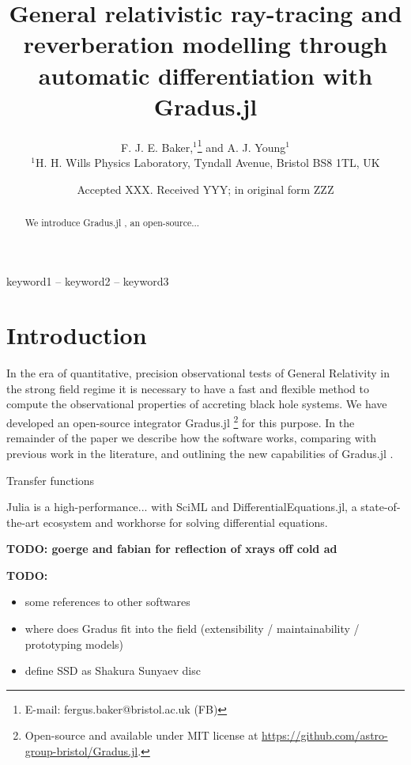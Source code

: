 \documentclass[fleqn,usenatbib]{mnras}
\title[Gradus.jl]{General relativistic ray-tracing and reverberation modelling through automatic differentiation with Gradus.jl}
\author[F. J. E. Baker et al.]{
F. J. E. Baker,$^{1}$\thanks{E-mail: fergus.baker@bristol.ac.uk (FB)}
and A. J. Young$^{1}$
\\
$^{1}$H. H. Wills Physics Laboratory, Tyndall Avenue, Bristol BS8 1TL, UK
}
\date{Accepted XXX. Received YYY; in original form ZZZ}
\newcommand{\todo}[1]{{\noindent \bf \color{red} TODO: #1}}
\newcommand{\notes}[1]{{\color{cyan} #1}}
\newcommand{\Gradus}{Gradus.jl }
\begin{document}
\label{firstpage}
\pagerange{\pageref{firstpage}--\pageref{lastpage}}
\maketitle
\begin{abstract}
	We introduce \Gradus, an open-source...
\end{abstract}

\begin{keywords}
keyword1 -- keyword2 -- keyword3
\end{keywords}



\section{Introduction}

\notes{
In the era of quantitative, precision observational tests of General Relativity in the strong field regime it is necessary to have a fast and flexible method to compute the observational properties of accreting black hole systems. We have developed an open-source integrator
\Gradus\footnote{Open-source and available under MIT license at \url{https://github.com/astro-group-bristol/Gradus.jl}.} for this purpose. In the remainder of the paper we describe how the software works, comparing with previous work in the literature, and outlining the new capabilities of \Gradus.

Transfer functions \citep{cunningham_effects_1975} %

Julia is a high-performance... with SciML and DifferentialEquations.jl, a state-of-the-art ecosystem and workhorse for solving differential equations.
}

\todo{goerge and fabian for reflection of xrays off cold ad}

\todo{
\begin{itemize}
    \item some references to other softwares
    \item where does Gradus fit into the field (extensibility / maintainability / prototyping models)
    \item define SSD as Shakura Sunyaev disc
\end{itemize}
}
\end{document}
